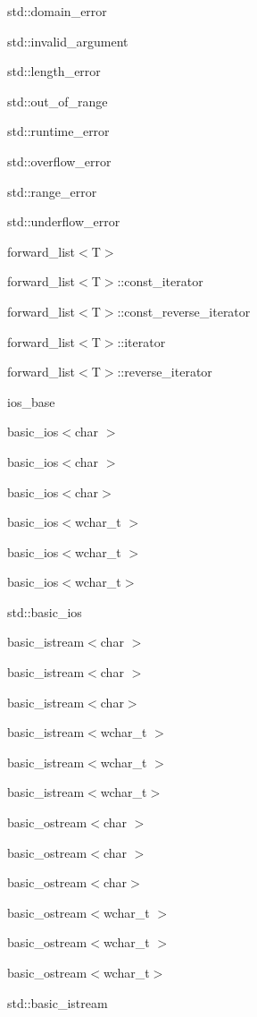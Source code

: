 \begin{DoxyCompactList}
\begin{DoxyCompactList}
\begin{DoxyCompactList}
\item std\+:\+:domain\+\_\+error\item std\+:\+:invalid\+\_\+argument\item std\+:\+:length\+\_\+error\item std\+:\+:out\+\_\+of\+\_\+range\end{DoxyCompactList}
\item std\+:\+:runtime\+\_\+error\begin{DoxyCompactList}
\item std\+:\+:overflow\+\_\+error\item std\+:\+:range\+\_\+error\item std\+:\+:underflow\+\_\+error\end{DoxyCompactList}
\end{DoxyCompactList}
\item forward\+\_\+list$<$T$>$\item forward\+\_\+list$<$T$>$\+:\+:const\+\_\+iterator\item forward\+\_\+list$<$T$>$\+:\+:const\+\_\+reverse\+\_\+iterator\item forward\+\_\+list$<$T$>$\+:\+:iterator\item forward\+\_\+list$<$T$>$\+:\+:reverse\+\_\+iterator\item ios\+\_\+base\begin{DoxyCompactList}
\item basic\+\_\+ios$<$char $>$\item basic\+\_\+ios$<$char $>$\item basic\+\_\+ios$<$char$>$\item basic\+\_\+ios$<$wchar\+\_\+t $>$\item basic\+\_\+ios$<$wchar\+\_\+t $>$\item basic\+\_\+ios$<$wchar\+\_\+t$>$\item std\+:\+:basic\+\_\+ios\begin{DoxyCompactList}
\item basic\+\_\+istream$<$char $>$\item basic\+\_\+istream$<$char $>$\item basic\+\_\+istream$<$char$>$\item basic\+\_\+istream$<$wchar\+\_\+t $>$\item basic\+\_\+istream$<$wchar\+\_\+t $>$\item basic\+\_\+istream$<$wchar\+\_\+t$>$\item basic\+\_\+ostream$<$char $>$\item basic\+\_\+ostream$<$char $>$\item basic\+\_\+ostream$<$char$>$\item basic\+\_\+ostream$<$wchar\+\_\+t $>$\item basic\+\_\+ostream$<$wchar\+\_\+t $>$\item basic\+\_\+ostream$<$wchar\+\_\+t$>$\item std\+:\+:basic\+\_\+istream\begin{DoxyCompactList}

\end{DoxyCompactList}
\end{DoxyCompactList}
\end{DoxyCompactList}
\end{DoxyCompactList}
